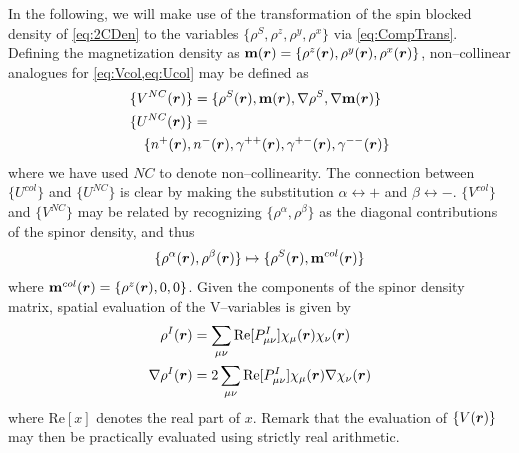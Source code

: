 In the following, we will make use of the transformation
of the spin blocked density of \cref{eq:2CDen} to the variables $\{\rho^S,\rho^z,\rho^y,\rho^x\}$
via \cref{eq:CompTrans}.  Defining
the magnetization density as $\mathbf{m}(\boldsymbol{r}) = \{\rho^z(\boldsymbol{r}), \rho^y(\boldsymbol{r}), \rho^x(\boldsymbol{r})\}$, non--collinear
analogues for \cref{eq:Vcol,eq:Ucol} may be defined as
\begin{align}
  \label{eq:NCAuxVar}
  &\{ V^{NC}(\boldsymbol{r}) \} = \{ \rho^S(\boldsymbol{r}), \mathbf{m}(\boldsymbol{r}), \nabla \rho^S, \nabla \mathbf{m}(\boldsymbol{r}) \} \\
  &\{ U^{NC}(\boldsymbol{r}) \} = \nonumber \\ &\quad\{ n^+(\boldsymbol{r}), n^-(\boldsymbol{r}), \gamma^{++}(\boldsymbol{r}), \gamma^{+-}(\boldsymbol{r}), \gamma^{--}(\boldsymbol{r}) \}
\end{align}
where we have used $NC$ to denote non--collinearity. The connection between $\{U^{col}\}$ and $\{U^{NC}\}$
is clear by making the substitution $\alpha \leftrightarrow +$ and $\beta \leftrightarrow -$. 
$\{V^{col}\}$ and $\{V^{NC}\}$ may be related by recognizing $\{\rho^\alpha,\rho^\beta\}$ as the diagonal contributions
of the spinor density, and thus
\begin{equation}
  \{\rho^\alpha(\boldsymbol{r}), \rho^\beta(\boldsymbol{r})\} \mapsto \{\rho^S(\boldsymbol{r}), \mathbf{m}^{col}(\boldsymbol{r})\}
\end{equation}
where $\mathbf{m}^{col}(\boldsymbol{r}) = \{\rho^z(\boldsymbol{r}),0,0\}$. Given the components of the spinor density matrix,
spatial evaluation of the V--variables is given by
\begin{align}
  \label{eq:VVarEval}
  \rho^I(\boldsymbol{r}) &= 
    \sum_{\mu\nu} \mathrm{Re}[P^I_{\mu\nu}] \chi_\mu(\boldsymbol{r}) \chi_\nu(\boldsymbol{r})\\
  \nabla\rho^I(\boldsymbol{r}) &= 
    2\sum_{\mu\nu} \mathrm{Re}[P^I_{\mu\nu}] \chi_\mu(\boldsymbol{r}) \nabla\chi_\nu(\boldsymbol{r})
\end{align}
where $\mathrm{Re}[x]$ denotes the real part of $x$. Remark that the evaluation of $\{V(\boldsymbol{r})\}$ may then be practically 
evaluated using strictly real arithmetic.

